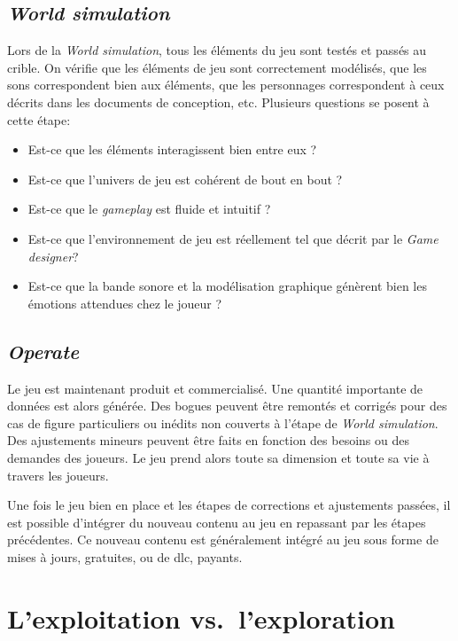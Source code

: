               
\subsection{\emph{World simulation}}
Lors de la \emph{World simulation}, tous les éléments du jeu sont testés et passés au crible.
On vérifie que les éléments de jeu sont correctement modélisés, que les sons correspondent bien aux éléments, que les personnages correspondent à ceux décrits dans les documents de conception, etc.
Plusieurs questions se posent à cette \'etape:
\begin{itemize}
    \item Est-ce que les éléments interagissent bien entre eux ?
    \item Est-ce que l'univers de jeu est cohérent de bout en bout ?
    \item Est-ce que le \emph{gameplay} est fluide et intuitif ?
    \item Est-ce que l'environnement de jeu est réellement tel que décrit par le \emph{Game designer}?
    \item Est-ce que la bande sonore et la modélisation graphique génèrent bien les émotions attendues chez le joueur ?
\end{itemize}


\subsection{\emph{Operate}}
Le jeu est maintenant produit et commercialisé.
Une quantité importante de données est alors générée.
Des bogues peuvent être remontés et corrigés pour des cas de figure particuliers ou inédits non couverts \`a l'étape de \emph{World simulation}.
Des ajustements mineurs peuvent être faits en fonction des besoins ou des demandes des joueurs.
Le jeu prend alors toute sa dimension et toute sa vie à travers les joueurs.

Une fois le jeu bien en place et les étapes de corrections et ajustements passées, il est possible d'intégrer du nouveau contenu au jeu en repassant par les étapes précédentes.
Ce nouveau contenu est généralement intégré au jeu sous forme de mises à jours, gratuites, ou de \gls{dlc}, payants.



\section{L'exploitation vs.\ l'exploration}
